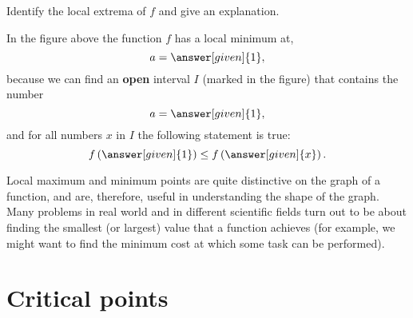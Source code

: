 \documentclass{ximera}
\begin{document}
\begin{example}
\begin{image}
\begin{tikzpicture}
	\end{tikzpicture}
	\end{image}
	Identify the local extrema of $f$ and give an explanation.
	\begin{explanation}
		In the figure above the function $f$ has a local minimum at,
		\[
		a=\answer[given]{1},
		\]
		because we can find an \textbf{open} interval $I$ (marked in the
		figure) that contains the number
		\[
		a=\answer[given]{1},
		\]
		and for all numbers $x$ in $I$ the following statement is true:
		 \[
		f\left(\answer[given]{1}\right)\le f\left(\answer[given]{x}\right).
		\]
	\end{explanation}
\end{example}

Local maximum and minimum points are quite distinctive on the graph of
a function, and are, therefore, useful in understanding the shape of the
graph. Many problems in real world and in different scientific fields turn out to be about
finding the smallest (or largest) value that a function achieves (for example, we might want
to find the minimum cost at which some task can be performed).



\section{Critical points}
\end{document}
